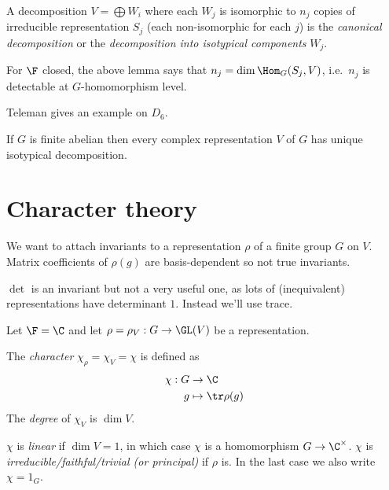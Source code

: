 \documentclass[a4paper]{article}
\begin{document}
\begin{definition}
  A decomposition \(V = \bigoplus W_i\) where each \(W_j\) is isomorphic to \(n_j\) copies of irreducible representation \(S_j\) (each non-isomorphic for each \(j\)) is the \emph{canonical decomposition} or the \emph{decomposition into isotypical components} \(W_j\).
\end{definition}

For \(\F\) closed, the above lemma says that \(n_j = \dim \Hom_G(S_j, V)\), i.e.\ \(n_j\) is detectable at \(G\)-homomorphism level.

\begin{eg}
  Teleman  gives an example on \(D_6\).

  If \(G\) is finite abelian then every complex representation \(V\) of \(G\) has unique isotypical decomposition.
\end{eg}

\section{Character theory}

We want to attach invariants to a representation \(\rho\) of a finite group \(G\) on \(V\). Matrix coefficients of \(\rho(g)\) are basis-dependent so not true invariants.

\(\det\) is an invariant but not a very useful one, as lots of (inequivalent) representations have determinant \(1\). Instead we'll use trace.

Let \(\F = \C\) and let \(\rho = \rho_V: G \to \GL(V)\) be a representation.

\begin{definition}[character]
  The \emph{character} \(\chi_\rho = \chi_V = \chi\) is defined as
  \begin{align*}
    \chi: G &\to \C \\
    g &\mapsto \tr \rho(g)
  \end{align*}
  The \emph{degree} of \(\chi_V\) is \(\dim V\).

  \(\chi\) is \emph{linear} if \(\dim V = 1\), in which case \(\chi\) is a homomorphism \(G \to \C^\times\). \(\chi\) is \emph{irreducible/faithful/trivial (or principal)} if \(\rho\) is. In the last case we also write \(\chi = 1_G\).
\end{definition}
\end{document}
